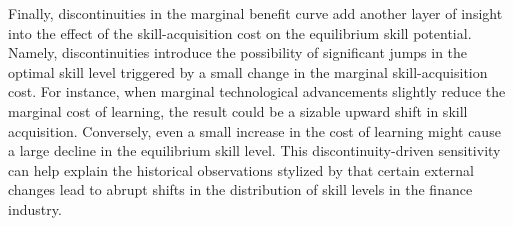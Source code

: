 Finally, discontinuities in the marginal benefit curve add another layer of insight into the effect of the skill-acquisition cost on the equilibrium skill potential. Namely, discontinuities introduce the possibility of significant jumps in the optimal skill level triggered by a small change in the marginal skill-acquisition cost. For instance, when marginal technological advancements slightly reduce the marginal cost of learning, the result could be a sizable upward shift in skill acquisition. Conversely, even a small increase in the cost of learning might cause a large decline in the equilibrium skill level. This discontinuity-driven sensitivity can help explain the historical observations stylized by \citet{philippon2012wages} that certain external changes lead to abrupt shifts in the distribution of skill levels in the finance industry.